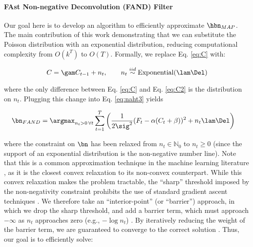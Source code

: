\paragraph{FAst Non-negative Deconvolution (FAND) Filter}

Our goal here is to develop an algorithm to efficiently approximate $\hbn_{MAP}$.  The main contribution of this work demonstrating that we can substitute the Poisson distribution with an exponential distribution, reducing computational complexity from $O(k^T)$ to $O(T)$.  Formally, we replace Eq. \eqref{eq:C} with:

\begin{align} \label{eq:C2}
	C = \gam C_{t-1} + n_t, \qquad n_t \overset{iid}{\sim} \text{Exponential}(\lam \Del)
\end{align}

\noindent where the only difference between Eq. \eqref{eq:C} and Eq. \eqref{eq:C2} is the distribution on $n_t$.  Plugging this change into Eq. \eqref{eq:naht3} yields

\begin{align} \label{eq:obj2}
\bn_{FAND} &= \argmax_{n_t>0 \, \forall t}  \sum_{t=1}^T \bigg( \frac{1}{2 \sig^2}(F_t - \alpha(C_t + \beta))^2  + n_t \lam \Del \bigg) %
\end{align}

\noindent where the constraint on $\bn$ has been relaxed from  $n_t \in \mathbb{N}_0$ to $n_t \geq 0$ (since the support of an exponential distribution is the non-negative number line).  Note that this is a common approximation technique in the machine learning literature \cite{HastieFriedman01}, as it is the closest convex relaxation to its non-convex counterpart. While this convex relaxation makes the problem tractable, the ``sharp'' threshold imposed by the non-negativity constraint prohibits the use of standard gradient ascent techniques \cite{BoydVandenberghe04}. We therefore take an ``interior-point'' (or ``barrier'') approach, in which we drop the sharp threshold, and add a barrier term, which must approach $-\infty$ as $n_t$ approaches zero (e.g., $-\log n_t$) \cite{BoydVandenberghe04}.  By iteratively reducing the weight of the barrier term, we are guaranteed to converge to the correct solution \cite{BoydVandenberghe04}.  Thus, our goal is to efficiently solve:

